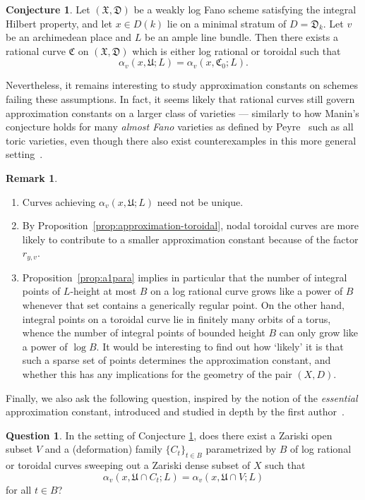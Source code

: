 \documentclass[a4paper, twoside, 11pt]{amsart}
\theoremstyle{definition}
\newtheorem{remark}[theorem]{Remark}
\newtheorem{conjecture}[theorem]{Conjecture}
\newtheorem{question}[theorem]{Question}
\newcommand{\mC}{\mathfrak{C}}
\newcommand{\mD}{\mathfrak{D}}
\newcommand{\mU}{\mathfrak{U}}
\newcommand{\mX}{\mathfrak{X}}
\begin{document}
    \begin{conjecture}\label{conj:integralmckinnon}
       Let $(\mX,\mD)$ be a weakly log Fano scheme satisfying the integral Hilbert property, and let $x\in D(k)$ lie on a minimal stratum of $D = \mD_k$. Let $v$ be an archimedean place and $L$ be an ample line bundle. Then there exists a rational curve $\mC$ on $(\mX,\mD)$ which is either log rational or toroidal such that $$\alpha_v(x, \mU;L)=\alpha_v(x, \mC_0;L).$$ 
    \end{conjecture}

	Nevertheless, it remains interesting to study approximation constants on schemes failing
	these assumptions. In fact, it seems likely that rational curves still govern approximation 
	constants on a larger class of varieties --- similarly to how Manin's conjecture
	holds for many \emph{almost Fano} varieties as defined by Peyre~\cite[Hyp.~3.27]{Peyre} such as
	all toric varieties, even though there also exist counterexamples in this more general setting~\cite[\S\,5.1]{MR4472281}.

    \begin{remark}
        \begin{enumerate}
        \item Curves achieving $\alpha_v(x, \mU;L)$ need not be unique.
        \item By Proposition~\ref{prop:approximation-toroidal}, nodal toroidal curves are more likely to contribute to a smaller approximation constant because of the factor $r_{y,v}$.
        \item Proposition~\ref{prop:a1para} implies in particular that the number of integral points of $L$-height at most $B$ on a log rational curve grows like a power of $B$ whenever that set contains a generically regular point. On the other hand, integral points on a toroidal curve lie in finitely many orbits of a torus, whence  the number of integral points of bounded height $B$ can only grow like a power of $\log B$. 
		It would be interesting to find out how `likely' it is that such a sparse set of points determines the approximation constant, and whether this has any implications for the geometry of the pair $(X,D)$.
        \end{enumerate}
    \end{remark}
       
    
   Finally, we also ask the following question, inspired by the notion of the \emph{essential} approximation constant, introduced and studied in depth by the first author~\cite{HuangIJNT,HuangAA,HuangBSMF,HuangANT}.
   \begin{question}\label{q:essential}
       In the setting of Conjecture \ref{conj:integralmckinnon}, does there exist a Zariski open subset $V$ and a (deformation) family $\{C_t\}_{t\in B}$ parametrized by $B$ of log rational or toroidal curves  sweeping out a Zariski dense subset of $X$ such that
	 	\begin{equation*}
			\alpha_v(x, \mU\cap C_t;L)=\alpha_v(x, \mU\cap V;L)
		\end{equation*}  
	   	for all $t\in B$?
   \end{question}
   
\end{document}
